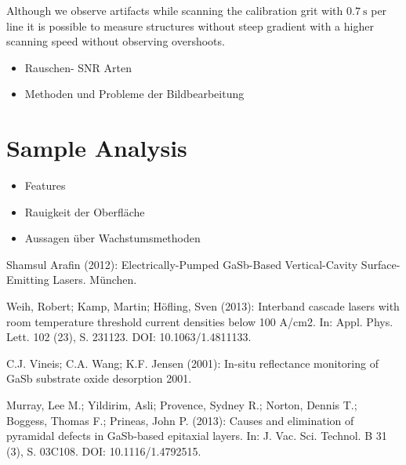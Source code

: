 \documentclass[paper=a4,fontsize=10pt,DIV=18,twocolumn,parskip=half]{scrartcl}
\numberwithin{equation}{section}    %
\begin{document}
Although we observe artifacts while scanning the calibration grit with  $\SI{0.7}{\second}$ per line it is possible to measure structures without steep gradient with a higher scanning speed without observing overshoots.


\begin{itemize}
\item Rauschen- SNR  Arten \\
\item Methoden und Probleme der Bildbearbeitung\\
\end{itemize}

\section{Sample Analysis}

\begin{itemize}
\item Features\\
\item Rauigkeit der Oberfläche\\
\item Aussagen über Wachstumsmethoden\\
\end{itemize}



\begin{thebibliography}{}   

 Shamsul Arafin (2012): Electrically-Pumped GaSb-Based 
Vertical-Cavity Surface-Emitting Lasers. München.

 Weih, Robert; Kamp, Martin; Höfling, Sven (2013): Interband 
cascade lasers with room temperature threshold current densities below 100 
A/cm2. In: Appl. Phys. Lett. 102 (23), S. 231123. DOI: 10.1063/1.4811133.

 C.J. Vineis; C.A. Wang; K.F. Jensen (2001): In-situ reflectance 
monitoring of GaSb substrate oxide desorption 2001.

 Murray, Lee M.; Yildirim, Asli; Provence, Sydney R.; Norton, 
Dennis T.; Boggess, Thomas F.; Prineas, John P. (2013): Causes and elimination 
of pyramidal defects in GaSb-based epitaxial layers. In: J. Vac. Sci. Technol. B 
31 (3), S. 03C108. DOI: 10.1116/1.4792515.
  

\end{thebibliography}
%
%
\onecolumn
\pagestyle{empty}
\end{document}
